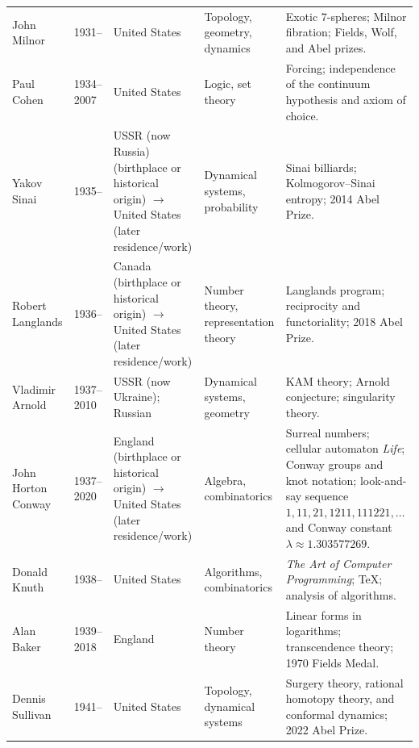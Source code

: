 {\begin{longtable}{@{}L{0.145\textwidth}L{0.09\textwidth}L{0.225\textwidth}L{0.14\textwidth}L{0.30\textwidth}@{}}
        John Milnor
        & 1931--
        & United States
        & Topology, geometry, dynamics
        & Exotic $7$-spheres; Milnor fibration; Fields, Wolf, and Abel prizes. \\

        Paul Cohen
        & 1934--2007
        & United States
        & Logic, set theory
        & Forcing; independence of the continuum hypothesis and axiom of
          choice. \\

        Yakov Sinai
        & 1935--
        & USSR (now Russia) (birthplace or historical origin) \(\to\) United States (later residence/work)
        & Dynamical systems, probability
        & Sinai billiards; Kolmogorov--Sinai entropy; 2014 Abel Prize. \\

        Robert Langlands
        & 1936--
        & Canada (birthplace or historical origin) \(\to\) United States (later residence/work)
        & Number theory, representation theory
        & Langlands program; reciprocity and functoriality; 2018 Abel Prize. \\

        Vladimir Arnold
        & 1937--2010
        & USSR (now Ukraine); Russian
        & Dynamical systems, geometry
        & KAM theory; Arnold conjecture; singularity theory. \\

        John Horton Conway
        & 1937--2020
        & England (birthplace or historical origin) \(\to\) United States (later residence/work)
        & Algebra, combinatorics
        & Surreal numbers; cellular automaton \textit{Life}; Conway groups and
          knot notation; look-and-say sequence
          $1,11,21,1211,111221,\dots$ and Conway constant
          $\lambda\approx1.303577269$. \\

        Donald Knuth
        & 1938--
        & United States
        & Algorithms, combinatorics
        & \textit{The Art of Computer Programming}; TeX; analysis of
          algorithms. \\

        Alan Baker
        & 1939--2018
        & England
        & Number theory
        & Linear forms in logarithms; transcendence theory; 1970 Fields Medal. \\

        Dennis Sullivan
        & 1941--
        & United States
        & Topology, dynamical systems
        & Surgery theory, rational homotopy theory, and conformal dynamics;
          2022 Abel Prize. \\


\end{longtable}}

